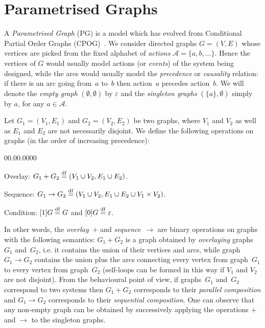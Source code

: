 \label{chap:PGAlgebra}

\section{Parametrised Graphs\label{sec:Parametrised-Graphs}}

A \emph{Parametrised Graph} (PG) is a model which has evolved from
Conditional Partial Order Graphs (CPOG)~\cite{2010_mokhov_ieee}.
We consider directed graphs $G=(V,E)$ whose vertices are picked from
the fixed alphabet of \emph{actions} $\mathcal{A}=\{a,b,...\}$. Hence
the vertices of $G$ would usually model actions (or \emph{events})
of the system being designed, while the arcs would usually model the
\emph{precedence} or \emph{causality} relation: if there is an arc
going from~$a$ to~$b$ then action~$a$ precedes action~$b$.
We will denote the \emph{empty graph} $(\emptyset,\emptyset)$ by
$\varepsilon$ and the \emph{singleton graphs} $(\{a\},\emptyset)$
simply by $a$, for any $a\in\mathcal{A}$.

Let $G_{1}=(V_{1},E_{1})$ and $G_{2}=(V_{2},E_{2})$ be two graphs,
where $V_{1}$ and $V_{2}$ as well as $E_{1}$ and $E_{2}$ are not
necessarily disjoint. We define the following operations on graphs
(in the order of increasing precedence):
\begin{lyxlist}{00.00.0000}
\item [{\hspace{6mm}Overlay:}] $G_{1}+G_{2}\overset{\mathrm{df}}{=}(V_{1}\cup V_{2},E_{1}\cup E_{2})$.
\item [{\hspace{6mm}Sequence:}] $G_{1}\rightarrow G_{2}\overset{\mathrm{df}}{=}(V_{1}\cup V_{2},E_{1}\cup E_{2}\cup V_{1}\times V_{2})$.
\item [{\hspace{6mm}Condition:}] $[1]G\overset{\mathrm{df}}{=} G$ and
$[0]G\overset{\mathrm{df}}{=}\varepsilon$.
\end{lyxlist}
In other words, the \emph{overlay}~$+$ and \emph{sequence}~$\rightarrow$
are binary operations on graphs with the following semantics: $G_{1}+G_{2}$
is a graph obtained by \emph{overlaying} graphs~$G_{1}$ and~$G_{2}$,
i.e. it contains the union of their vertices and arcs, while graph
$G_{1}\rightarrow G_{2}$ contains the union plus the arcs connecting
every vertex from graph~$G_{1}$ to every vertex from graph~$G_{2}$
(self-loops can be formed in this way if $V_{1}$ and $V_{2}$ are
not disjoint). From the behavioural point of view, if graphs~$G_{1}$
and~$G_{2}$ correspond to two systems then $G_{1}+G_{2}$ corresponds
to their \emph{parallel composition} and $G_{1}\rightarrow G_{2}$
corresponds to their \emph{sequential composition}. One can observe
that any non-empty graph can be obtained by successively applying
the operations $+$ and $\rightarrow$ to the singleton graphs.


